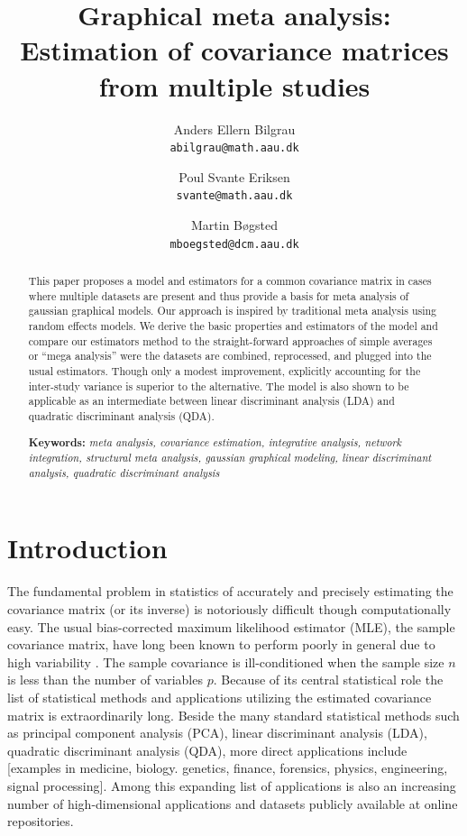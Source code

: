 \documentclass{article}\usepackage[]{graphicx}\usepackage[]{color}
\title{Graphical meta analysis: Estimation of covariance matrices from multiple studies}
\author{
  Anders Ellern Bilgrau \\ \texttt{abilgrau@math.aau.dk} \and
  Poul Svante Eriksen \\ \texttt{svante@math.aau.dk} \and
  Martin B\o{}gsted \\ \texttt{m\textunderscore{}boegsted@dcm.aau.dk}
}
\makeatletter
\newenvironment{kframe}{%
 \def\at@end@of@kframe{}%
 \ifinner\ifhmode%
  \def\at@end@of@kframe{\end{minipage}}%
  \begin{minipage}{\columnwidth}%
 \fi\fi%
 \def\FrameCommand##1{\hskip\@totalleftmargin \hskip-\fboxsep
 \colorbox{shadecolor}{##1}\hskip-\fboxsep
     \hskip-\linewidth \hskip-\@totalleftmargin \hskip\columnwidth}%
 \MakeFramed {\advance\hsize-\width
   \@totalleftmargin\z@ \linewidth\hsize
   \@setminipage}}%
 {\par\unskip\endMakeFramed%
 \at@end@of@kframe}
\newenvironment{knitrout}{}{} %
\makeatother
\begin{document}
\begin{knitrout}
\color{fgcolor}\begin{kframe}


{\ttfamily\noindent\bfseries\color{errorcolor}{\#\# Error: object 'misclassification.risks' not found}}\end{kframe}
\end{knitrout}


\maketitle
\begin{abstract}
This paper proposes a model and estimators for a common covariance matrix in cases where multiple datasets are present and thus provide a basis for meta analysis of gaussian graphical models. Our approach is inspired by traditional meta analysis using random effects models. We derive the basic properties and estimators of the model and compare our estimators method to the straight-forward approaches of simple averages or ``mega analysis'' were the datasets are combined, reprocessed, and plugged into the usual estimators. Though only a modest improvement, explicitly accounting for the inter-study variance is superior to the alternative. The model is also shown to be applicable as an intermediate between linear discriminant analysis (LDA) and quadratic discriminant analysis (QDA). \medskip

\noindent \textbf{Keywords:} \textit{meta analysis, covariance estimation, integrative analysis, network integration, structural meta analysis, gaussian graphical modeling, linear discriminant analysis, quadratic discriminant analysis}
\end{abstract}

\newpage
\tableofcontents


\newpage
\section{Introduction}
The fundamental problem in statistics of accurately and precisely estimating the covariance matrix (or its inverse) is notoriously difficult though computationally easy. The usual bias-corrected maximum likelihood estimator (MLE), the sample covariance matrix, have long been known to perform poorly in general due to high variability \citep{Dempster1972}. The sample covariance is ill-conditioned when the sample size $n$ is less than the number of variables $p$. Because of its central statistical role the list of statistical methods and applications utilizing the estimated covariance matrix is extraordinarily long. Beside the many standard statistical methods such as principal component analysis (PCA), linear discriminant analysis (LDA), quadratic discriminant analysis (QDA), more direct applications include [examples in medicine, biology. genetics, finance, forensics, physics, engineering, signal processing]. Among this expanding list of applications is also an increasing number of high-dimensional applications and datasets publicly available at online repositories.
\end{document}
